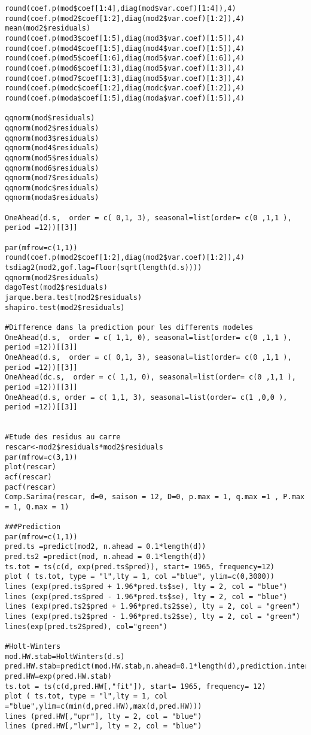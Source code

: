 \documentclass[11pt,a4paper]{article}
\begin{document}
\begin{lstlisting}[breaklines]
round(coef.p(mod$coef[1:4],diag(mod$var.coef)[1:4]),4)
round(coef.p(mod2$coef[1:2],diag(mod2$var.coef)[1:2]),4)
mean(mod2$residuals)
round(coef.p(mod3$coef[1:5],diag(mod3$var.coef)[1:5]),4)
round(coef.p(mod4$coef[1:5],diag(mod4$var.coef)[1:5]),4)
round(coef.p(mod5$coef[1:6],diag(mod5$var.coef)[1:6]),4)
round(coef.p(mod6$coef[1:3],diag(mod5$var.coef)[1:3]),4)
round(coef.p(mod7$coef[1:3],diag(mod5$var.coef)[1:3]),4)
round(coef.p(modc$coef[1:2],diag(modc$var.coef)[1:2]),4)
round(coef.p(moda$coef[1:5],diag(moda$var.coef)[1:5]),4)

qqnorm(mod$residuals)
qqnorm(mod2$residuals)
qqnorm(mod3$residuals)
qqnorm(mod4$residuals)
qqnorm(mod5$residuals)
qqnorm(mod6$residuals)
qqnorm(mod7$residuals)
qqnorm(modc$residuals)
qqnorm(moda$residuals)

OneAhead(d.s,  order = c( 0,1, 3), seasonal=list(order= c(0 ,1,1 ), period =12))[[3]]

par(mfrow=c(1,1))
round(coef.p(mod2$coef[1:2],diag(mod2$var.coef)[1:2]),4)
tsdiag2(mod2,gof.lag=floor(sqrt(length(d.s))))
qqnorm(mod2$residuals)
dagoTest(mod2$residuals)
jarque.bera.test(mod2$residuals)
shapiro.test(mod2$residuals)

#Difference dans la prediction pour les differents modeles
OneAhead(d.s,  order = c( 1,1, 0), seasonal=list(order= c(0 ,1,1 ), period =12))[[3]]  
OneAhead(d.s,  order = c( 0,1, 3), seasonal=list(order= c(0 ,1,1 ), period =12))[[3]]
OneAhead(dc.s,  order = c( 1,1, 0), seasonal=list(order= c(0 ,1,1 ), period =12))[[3]] 
OneAhead(d.s, order = c( 1,1, 3), seasonal=list(order= c(1 ,0,0 ), period =12))[[3]]

  
#Etude des residus au carre
rescar<-mod2$residuals*mod2$residuals
par(mfrow=c(3,1))
plot(rescar)
acf(rescar)
pacf(rescar)
Comp.Sarima(rescar, d=0, saison = 12, D=0, p.max = 1, q.max =1 , P.max = 1, Q.max = 1)

###Prediction
par(mfrow=c(1,1))
pred.ts =predict(mod2, n.ahead = 0.1*length(d))
pred.ts2 =predict(mod, n.ahead = 0.1*length(d))
ts.tot = ts(c(d, exp(pred.ts$pred)), start= 1965, frequency=12)
plot ( ts.tot, type = "l",lty = 1, col ="blue", ylim=c(0,3000))
lines (exp(pred.ts$pred + 1.96*pred.ts$se), lty = 2, col = "blue")
lines (exp(pred.ts$pred - 1.96*pred.ts$se), lty = 2, col = "blue")
lines (exp(pred.ts2$pred + 1.96*pred.ts2$se), lty = 2, col = "green")
lines (exp(pred.ts2$pred - 1.96*pred.ts2$se), lty = 2, col = "green")
lines(exp(pred.ts2$pred), col="green")

#Holt-Winters
mod.HW.stab=HoltWinters(d.s)
pred.HW.stab=predict(mod.HW.stab,n.ahead=0.1*length(d),prediction.interval=TRUE)
pred.HW=exp(pred.HW.stab)
ts.tot = ts(c(d,pred.HW[,"fit"]), start= 1965, frequency= 12)
plot ( ts.tot, type = "l",lty = 1, col ="blue",ylim=c(min(d,pred.HW),max(d,pred.HW)))
lines (pred.HW[,"upr"], lty = 2, col = "blue")
lines (pred.HW[,"lwr"], lty = 2, col = "blue")


\end{lstlisting}
\end{document}
